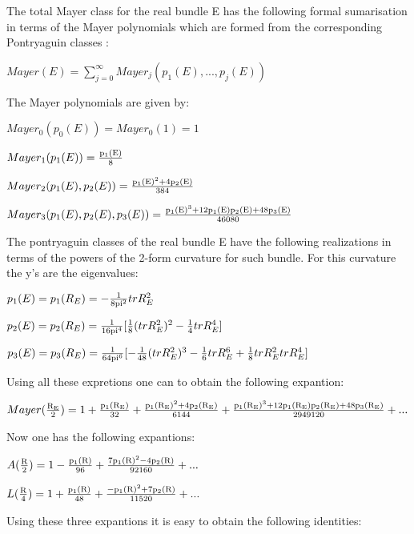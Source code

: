 \documentclass[a4paper,a4paper]{article}
\begin{document}
The total Mayer class for the real bundle E has the following formal sumarisation in terms of the Mayer polynomials which are formed from the corresponding Pontryaguin classes :
\begin{center}
{  $ Mayer(E) = \sum_{j=0}^{\infty}Mayer_j(p_1(E),...,p_j(E)) $ }
\end{center}
The Mayer polynomials are given by:
\begin{center}
{  $ Mayer_0(p_0(E)) = Mayer_0(1)=1 $ }
\end{center}
\begin{center}
{  $ Mayer_1(p_1(E)) = \frac{\rm p_1(E)}{\rm 8} $ }
\end{center}
\begin{center}
{  $ Mayer_2(p_1(E),p_2(E)) = \frac{\rm p_1(E)^2+4p_2(E)}{\rm 384} $ }
\end{center}
\begin{center}
{  $ Mayer_3(p_1(E),p_2(E),p_3(E)) = \frac{\rm p_1(E)^3+12p_1(E)p_2(E)+48p_3(E)}{\rm 46080} $ }
\end{center}
The pontryaguin classes of the real bundle E have the following realizations in terms of the powers of the 2-form curvature for such bundle.  For this curvature  the y's are the eigenvalues:
\begin{center}
{  $  p_1(E)=p_1(R_E) =-\frac{\rm 1}{\rm 8pi^2}trR_E^2 $ }
\end{center}
\begin{center}
{  $  p_2(E)=p_2(R_E) =\frac{\rm 1}{\rm 16pi^4}[\frac{\rm 1}{\rm 8}(trR_E^2)^2-\frac{\rm 1}{\rm 4}trR_E^4] $ }
\end{center}
\begin{center}
{  $  p_3(E)=p_3(R_E) =\frac{\rm 1}{\rm 64pi^6}[-\frac{\rm 1}{\rm 48}(trR_E^2)^3-\frac{\rm 1}{\rm 6}trR_E^6+\frac{\rm 1}{\rm 8}trR_E^2trR_E^4] $ }
\end{center}
Using all these expretions one can to obtain the following expantion:
\begin{center}
\setlength{\baselineskip}{30pt} 
{  $  Mayer(\frac{\rm R_E}{\rm 2}) = 1+\frac{\rm p_1(R_E)}{\rm 32}+\frac{\rm p_1(R_E)^2+4p_2(R_E)}{\rm 6144}+\frac{\rm p_1(R_E)^3+12p_1(R_E)p_2(R_E)+48p_3(R_E)}{\rm 2949120}+...$ }
\end{center}
Now one has the following expantions:
\begin{center}
\setlength{\baselineskip}{30pt} 
{  $  A(\frac{\rm R}{\rm 2}) = 1-\frac{\rm p_1(R)}{\rm 96}+\frac{\rm 7p_1(R)^2-4p_2(R)}{\rm 92160}+...$ }
\end{center}
\begin{center}
\setlength{\baselineskip}{30pt} 
{  $  L(\frac{\rm R}{\rm 4}) = 1+\frac{\rm p_1(R)}{\rm 48}+\frac{\rm -p_1(R)^2+7p_2(R)}{\rm 11520}+...$ }
\end{center}
Using these three expantions it is easy to obtain the following identities:
\end{document}
